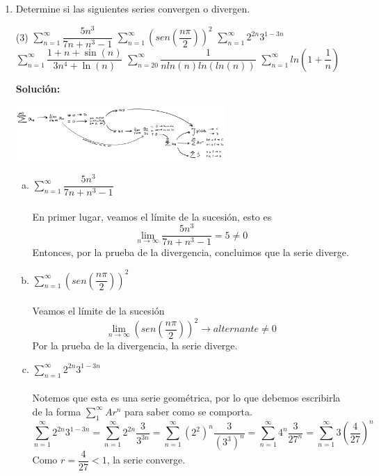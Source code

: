 \documentclass[12pt]{article}
\newenvironment{solucion}
{\begin{mdframed}[backgroundcolor=black!10]
		{\bf Solución:}\\
	}
	{
	\end{mdframed}
}
\newenvironment{preguntas}
{\begin{enumerate}\itemsep12pt
	}
	{
	\end{enumerate}
}
\newcommand{\ra}{\rightarrow}
\begin{document}
\begin{preguntas}
\item Determine si las siguientes series convergen o divergen.
\begin{tasks}(3)
\task $\sum\limits_{n=1}^{\infty}\dfrac{5n^3}{7n+n^3-1}$
\task $\sum\limits_{n=1}^{\infty}\left(sen\left(\dfrac{n\pi}{2}\right)\right)^2$
\task $\sum\limits_{n=1}^{\infty}2^{2n}3^{1-3n}$
\task $\sum\limits_{n=1}^{\infty}\dfrac{1 + n + \sin(n)}{3n^4 + \ln(n)}$
\task $\sum\limits_{n=20}^{\infty}\dfrac{1}{nln(n)ln(ln(n))}$
\task $\sum\limits_{n=1}^{\infty}ln\left(1+\dfrac{1}{n}\right)$
\end{tasks}
\begin{solucion}
\begin{center}
\includegraphics[width=8cm]{../../../../img/mapa_series}
\end{center}
\begin{enumerate}[a)]
\item $\sum\limits_{n=1}^{\infty}\dfrac{5n^3}{7n+n^3-1}$\\
			\\
			En primer lugar, veamos el límite de la sucesión, esto es
			$$\lim\limits_{n\ra \infty} \dfrac{5n^3}{7n+n^3-1} = 5 \neq 0$$
			Entonces, por la prueba de la divergencia, concluimos que la serie diverge.
\item $\sum\limits_{n=1}^{\infty}\left(sen\left(\dfrac{n\pi}{2}\right)\right)^2$\\
			\\
			Veamos el límite de la sucesión
			$$\lim\limits_{n\ra \infty} \left(sen\left(\dfrac{n\pi}{2}\right)\right)^2 \ra alternante \neq 0$$
			Por la prueba de la divergencia, la serie diverge.
\item $\sum\limits_{n=1}^{\infty}2^{2n}3^{1-3n}$\\
			\\
			Notemos que esta es una serie geométrica, por lo que debemos escribirla de la forma $\sum\limits_1^{\infty} Ar^n$ para saber como se comporta.
$$\sum\limits_{n=1}^{\infty}2^{2n}3^{1-3n} 
= \sum\limits_{n=1}^{\infty}2^{2n} \dfrac{3}{3^{3n}}
= \sum\limits_{n=1}^{\infty}(2^2)^n \dfrac{3}{(3^3)^n}
= \sum\limits_{n=1}^{\infty}4^n \dfrac{3}{27^n}
= \sum\limits_{n=1}^{\infty} 3 \left(\dfrac{4}{27}\right)^n$$
			Como $r = \dfrac{4}{27} <1$, la serie converge.

\end{enumerate}
\end{solucion}
\end{preguntas}
\end{document}
